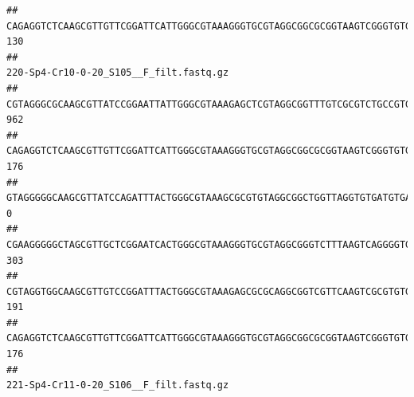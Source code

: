 \documentclass[]{article}
\begin{document}
\begin{verbatim}
## CAGAGGTCTCAAGCGTTGTTCGGATTCATTGGGCGTAAAGGGTGCGTAGGCGGCGCGGTAAGTCGGGTGTGAAATCTCGGGGCTTAACTCCGAAACTGCATTCGATACTGCCGTGCTTGAGGACTGGAGAGGAGACTGGAATTTACGGTGTAGCGGTGAAATGCGTAGATATCGTAAGGAAGACCAGTGGCGAAGGCGGGTCTCTGGACAGTTCCTGACGCTGAGGCACGAAGGCCAGGGGAGCAAACG                                    130
##                                                                                                                                                                                                                                                           220-Sp4-Cr10-0-20_S105__F_filt.fastq.gz
## CGTAGGGCGCAAGCGTTATCCGGAATTATTGGGCGTAAAGAGCTCGTAGGCGGTTTGTCGCGTCTGCCGTGAAAGTCCGGGGCTCAACTCCGGATCTGCGGTGGGTACGGGCAGACTAGAGTGATGTAGGGGAGACTGGAATTCCTGGTGTAGCGGTGAAATGCGCAGATATCAGGAGGAACACCGATGGCGAAGGCAGGTCTCTGGGCATTAACTGACGCTGAGGAGCGAAAGCATGGGGAGCGAACA                                     962
## CAGAGGTCTCAAGCGTTGTTCGGATTCATTGGGCGTAAAGGGTGCGTAGGCGGCGCGGTAAGTCGGGTGTGAAATCTCGGAGCTTAACTCCGAAACTGCATTCGATACTGCCGTGCTTGAGGACTGGAGAGGAGACTGGAATTTACGGTGTAGCGGTGAAATGCGTAGATATCGTAAGGAAGACCAGTGGCGAAGGCGGGTCTCTGGACAGTTCCTGACGCTGAGGCACGAAGGCCAGGGGAGCAAACG                                     176
## GTAGGGGGCAAGCGTTATCCAGATTTACTGGGCGTAAAGCGCGTGTAGGCGGCTGGTTAGGTGTGATGTGAAATCTTCCGGCTCAACCGGAAAACTGCATTGCAAACCGGCCTGGCTAGAGTGCAGGAGAGGGAAGCGGAATTCCAGGTGTAGCGGTGAAATGCGTAGATATCTGGAGGAACACCAGTGGCGAAGGCGGCTTCCTGGCCTGCAACTGACGCTGAGACGCGAAAGCGTGGGGAGCGAAC                                        0
## CGAAGGGGGCTAGCGTTGCTCGGAATCACTGGGCGTAAAGGGTGCGTAGGCGGGTCTTTAAGTCAGGGGTGAAATCCTGGAGCTCAACTCCAGAACTGCCTTTGATACTGAAGATCTTGAGTTCGGGAGAGGTGAGTGGAACTGCGAGTGTAGAGGTGAAATTCGTAGATATTCGCAAGAACACCAGTGGCGAAGGCGGCTCACTGGCCCGATACTGACGCTGAGGCACGAAAGCGTGGGGAGCAAACA                                     303
## CGTAGGTGGCAAGCGTTGTCCGGATTTACTGGGCGTAAAGAGCGCGCAGGCGGTCGTTCAAGTCGCGTGTGAAAGCCCCCGGCTCAACTGGGGAGGGTCACGCGATACTGATCGACTCGAAGGCAGGAGAGGGTAGTGGAATTCCCGGTGTAGTGGTGAAATGCGTAGATATCGGGAGGAACACCAGTGGCGAAGGCGACTACCTGGCCTGTTCTTGACGCTGAGGCGCGAAAGCTAGGGGAGCAAACG                                     191
## CAGAGGTCTCAAGCGTTGTTCGGATTCATTGGGCGTAAAGGGTGCGTAGGCGGCGCGGTAAGTCGGGTGTGAAATCTCGGGGCTTAACTCCGAAACTGCATTCGATACTGCCGTGCTTGAGGACTGGAGAGGAGACTGGAATTTACGGTGTAGCGGTGAAATGCGTAGATATCGTAAGGAAGACCAGTGGCGAAGGCGGGTCTCTGGACAGTTCCTGACGCTGAGGCACGAAGGCCAGGGGAGCAAACG                                     176
##                                                                                                                                                                                                                                                           221-Sp4-Cr11-0-20_S106__F_filt.fastq.gz

\end{verbatim}
\end{document}
